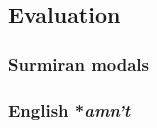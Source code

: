 \subsection{Evaluation}

\subsubsection{Surmiran modals}

\citet{Anderson2010}

\subsubsection{English *\emph{amn't}}

\citet{Bresnan2001}
\citet{Embick2010}
